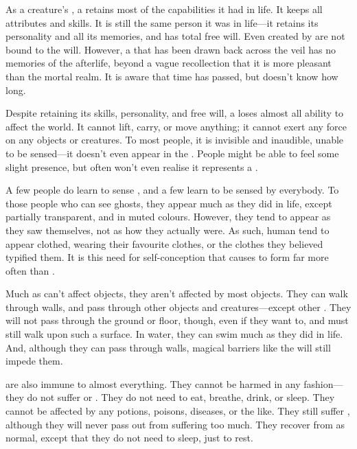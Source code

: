 As a creature's {\soul}, a {\ghost} retains most of the capabilities it had in life.
It keeps all attributes and skills.
It is still the same person it was in life---it retains its personality and all its memories, and has total free will.
Even {\ghosts} created by  are not bound to the  will.
However, a {\ghost} that has been drawn back across the veil has no memories of the afterlife, beyond a vague recollection that it is more pleasant than the mortal realm.
It is aware that time has passed, but doesn't know how long.

Despite retaining its skills, personality, and free will, a {\ghost} loses almost all ability to affect the world.
It cannot lift, carry, or move anything; it cannot exert any force on any objects or creatures.
To most people, it is invisible and inaudible, unable to be sensed---it doesn't even appear in the {\mentalrealm}.
People might be able to feel some slight presence, but often won't even realise it represents a {\ghost}.

A few people do learn to sense {\ghosts}, and a few {\ghosts} learn to be sensed by everybody.
To those people who can see ghosts, they appear much as they did in life, except partially transparent, and in muted colours.
However, they tend to appear as they saw themselves, not as how they actually were.
As such, human {\ghosts} tend to appear clothed, wearing their favourite clothes, or the clothes they believed typified them.
It is this need for self-conception that causes {\strongsouls} to form {\ghosts} far more often than {\weaksouls}.

Much as {\ghosts} can't affect objects, they aren't affected by most objects.
They can walk through walls, and pass through other objects and creatures---except other {\ghosts}.
They will not pass through the ground or floor, though, even if they want to, and must still walk upon such a surface.
In water, they can swim much as they did in life.
And, although they can pass through walls, magical barriers like the  will still impede them.

\capital{\ghosts} are also immune to almost everything.
They cannot be harmed in any fashion---they do not suffer {\damage} or {\shock}.
They do not need to eat, breathe, drink, or sleep.
They cannot be affected by any potions, poisons, diseases, or the like.
They still suffer {\exhaustion}, although they will never pass out from suffering too much.
They recover from {\exhaustion} as normal, except that they do not need to sleep, just to rest.

